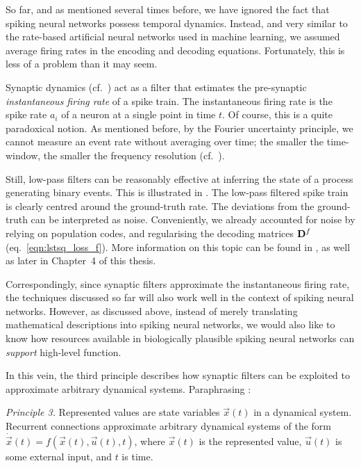 So far, and as mentioned several times before, we have ignored the fact that spiking neural networks possess temporal dynamics.
Instead, and very similar to the rate-based artificial neural networks used in machine learning, we assumed average firing rates in the encoding and decoding equations.
Fortunately, this is less of a problem than it may seem.

Synaptic dynamics (cf.~) act as a filter that estimates the pre-synaptic \emph{instantaneous firing rate} of a spike train.
The instantaneous firing rate is the spike rate $a_i$ of a neuron at a single point in time $t$.
Of course, this is a quite paradoxical notion.
As mentioned before, by the Fourier uncertainty principle, we cannot measure an event rate without averaging over time; the smaller the time-window, the smaller the frequency resolution (cf.~\cite{gabor1946theory}).

Still, low-pass filters can be reasonably effective at inferring the state of a process generating binary events.
This is illustrated in .
The low-pass filtered spike train is clearly centred around the ground-truth rate.
The deviations from the ground-truth can be interpreted as noise.
Conveniently, we already accounted for noise by relying on population codes, and regularising the decoding matrices $\mathbf{D}^f$ (eq.~\ref{eqn:lstsq_loss_f}).
More information on this topic can be found in \citet[Chapter~4]{eliasmith2003neural}, as well as later in Chapter~4 of this thesis.

Correspondingly, since synaptic filters approximate the instantaneous firing rate, the techniques discussed so far will also work well in the context of spiking neural networks.
However, as discussed above, instead of merely translating mathematical descriptions into spiking neural networks, we would also like to know how resources available in biologically plausible spiking neural networks can \emph{support} high-level function.

In this vein, the third \NEF principle describes how synaptic filters can be exploited to approximate arbitrary dynamical systems.
Paraphrasing \citet{eliasmith2003neural}:
\begin{framed}
	\noindent\emph{\NEF Principle 3.}
	Represented values are state variables $\vec x(t)$ in a dynamical system. Recurrent connections approximate arbitrary dynamical systems of the form $\dot{\vec x}(t) = f(\vec x(t), \vec u(t), t)$, where $\vec x(t)$ is the represented value, $\vec u(t)$ is some external input, and $t$ is time.
\end{framed}

